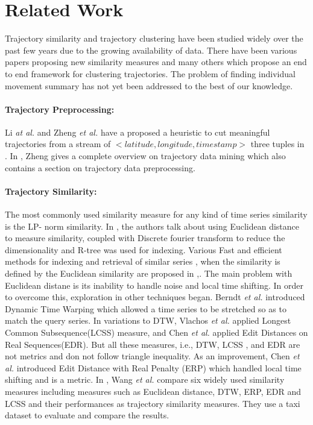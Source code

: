 \section{Related Work}

Trajectory similarity and trajectory clustering have been studied widely over the past few years due to the growing availability of data. There have been various papers proposing new similarity measures and many others which propose an end to end framework for clustering trajectories. The problem of finding individual movement summary has not yet been addressed to the best of our knowledge. 

\paragraph{Trajectory Preprocessing:}
Li \emph{at al.} and Zheng \emph{et al.} have a proposed a heuristic to cut meaningful trajectories from a stream of $<latitude, longitude, timestamp>$ three tuples in \cite{trajcut1,trajcut2}. In \cite{trajcut3}, Zheng gives a complete overview on trajectory data mining which also contains a section on trajectory data preprocessing.  

\paragraph{Trajectory Similarity:}
The most commonly used similarity measure for any kind of time series similarity is the LP- norm similarity. In \cite{lp1}, the authors talk about using Euclidean distance to measure similarity, coupled with Discrete fourier transform to reduce the dimensionality and R-tree was used for indexing. Various Fast and efficient methods for indexing and retrieval of similar series , when the similarity is defined by the Euclidean similarity are proposed in \cite{lp1},\cite{lp2}. 
The main problem with Euclidean distane is its inability to handle noise and local time shifting. In order to overcome this, exploration in other techniques began. Berndt \emph{et al.} \cite{dtw} introduced Dynamic Time Warping which allowed  a time series to be stretched so as to match the query series. In variations to DTW, Vlachos \emph{et al.} \cite{Vlachos2002} applied Longest Common Subsequence(LCSS) measure, and Chen \emph{et al.}\cite{Chen2005} applied  Edit Distances on Real Sequences(EDR). But all these measures, i.e., DTW, LCSS , and EDR are not metrics and don not follow triangle inequality. As an improvement, Chen \emph{et al.}\cite{Chen2005} introduced Edit Distance with Real Penalty (ERP) which handled local time shifting and is a metric. In \cite{simcomp}, Wang \emph{et al.} compare six widely used similarity measures including measures such as Euclidean distance, DTW, ERP, EDR and LCSS and their performances as trajectory similarity measures. They use a taxi dataset to evaluate and compare the results. 

